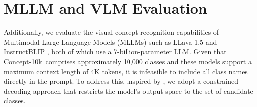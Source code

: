 \documentclass[11pt]{article}
\newcommand{\benchmark}{Concept-10k}
\begin{document}
\section{MLLM and VLM Evaluation}
\label{app:MLLM}
Additionally, we evaluate the visual concept recognition capabilities of Multimodal Large Language Models (MLLMs) such as LLava-1.5 \cite{liu2024improved} and InstructBLIP \cite{InstructBLIP}, both of which use a 7-billion-parameter LLM.
Given that \benchmark~comprises approximately 10,000 classes and these models support a maximum context length of 4K tokens, it is infeasible to include all class names directly in the prompt.
To address this, inspired by \citet{de2020autoregressive}, we adopt a constrained decoding approach that restricts the model’s output space to the set of candidate classes.




\end{document}

